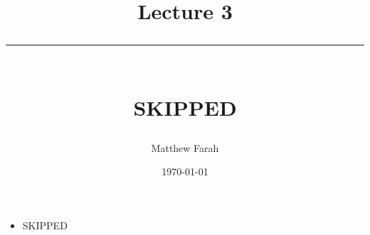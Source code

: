 \documentclass{article}
\date{
	\vspace{-.75em}
	{\large \today}
}
\title{
	\vspace*{-1.5em}
	{\Huge Lecture 3} \\
	\vspace{-1em}
	\rule{\textwidth/4}{.01em} \\
	\vspace{-.25em}
	{\Large SKIPPED}
	\vspace{-.75em}
}
\author{
	{\large Matthew Farah}
}
\begin{document}
\maketitle
\pagestyle{fancy}

\fi

\begin{itemize}
	\item SKIPPED
\end{itemize}

\ifdefined\iscombined
	\newpage
\else
	
\end{document}
